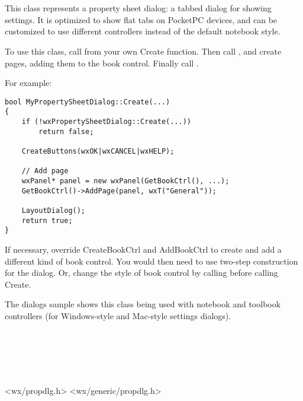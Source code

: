 \section{}\label{wxpropertysheetdialog}

This class represents a property sheet dialog: a tabbed dialog
for showing settings. It is optimized to show flat tabs
on PocketPC devices, and can be customized to use different
controllers instead of the default notebook style.

To use this class, call  from your own
Create function. Then call , and create pages, adding them to the book control.
Finally call .

For example:

\begin{verbatim}
bool MyPropertySheetDialog::Create(...)
{
    if (!wxPropertySheetDialog::Create(...))
        return false;

    CreateButtons(wxOK|wxCANCEL|wxHELP);

    // Add page
    wxPanel* panel = new wxPanel(GetBookCtrl(), ...);
    GetBookCtrl()->AddPage(panel, wxT("General"));

    LayoutDialog();
    return true;
}
\end{verbatim}

If necessary, override CreateBookCtrl and AddBookCtrl to create and add a different
kind of book control. You would then need to use two-step construction for the dialog.
Or, change the style of book control by calling  
before calling Create.

The dialogs sample shows this class being used with notebook and toolbook controllers (for
Windows-style and Mac-style settings dialogs).


\\
\\
\\
\\


<wx/propdlg.h>
<wx/generic/propdlg.h>

